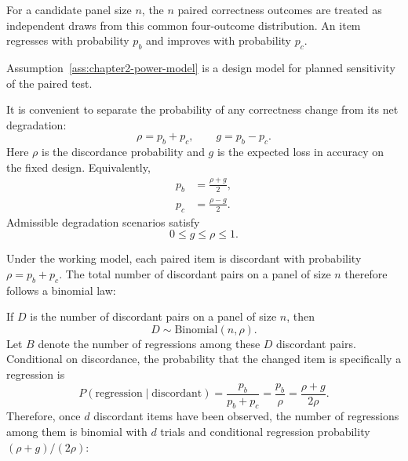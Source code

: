 \begin{assumption}
For a candidate panel size \(n\), the \(n\) paired correctness outcomes are treated as independent draws from this common four-outcome distribution. An item regresses with probability \(p_b\) and improves with probability \(p_c\).
\label{ass:chapter2-power-model}
\end{assumption}

Assumption~\ref{ass:chapter2-power-model} is a design model for planned sensitivity of the paired test.

It is convenient to separate the probability of any correctness change from its net degradation:
\begin{equation}
    \rho=p_b+p_c,
    \qquad
    g=p_b-p_c.
    \label{eq:rho-g-definition}
\end{equation}
Here \(\rho\) is the discordance probability and \(g\) is the expected loss in accuracy on the fixed design. Equivalently,
\begin{align}
    p_b&=\frac{\rho+g}{2},\\
    p_c&=\frac{\rho-g}{2}.
    \label{eq:rho-g-inverse}
\end{align}
Admissible degradation scenarios satisfy
\begin{equation}
    0\le g\le\rho\le1.
    \label{eq:admissible-power-region}
\end{equation}

Under the working model, each paired item is discordant with probability \(\rho=p_b+p_c\). The total number of discordant pairs on a panel of size \(n\) therefore follows a binomial law:

If \(D\) is the number of discordant pairs on a panel of size \(n\), then
\begin{equation}
    D\sim\mathrm{Binomial}(n,\rho).
    \label{eq:discordance-binomial}
\end{equation}
Let \(B\) denote the number of regressions among these \(D\) discordant pairs.
Conditional on discordance, the probability that the changed item is specifically a regression is
\begin{equation}
P(\text{regression}\mid\text{discordant})
=
\frac{p_b}{p_b+p_c}
=
\frac{p_b}{\rho}
=
\frac{\rho+g}{2\rho}.
\label{eq:design-conditional-regression-probability}
\end{equation}
Therefore, once \(d\) discordant items have been observed, the number of regressions among them is binomial with \(d\) trials and conditional regression probability \((\rho+g)/(2\rho)\):

